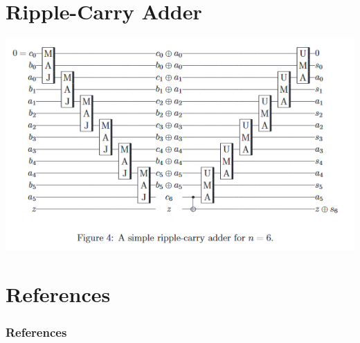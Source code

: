 \documentclass{beamer}
\begin{document}
    \section{Ripple-Carry Adder}
    \begin{frame}
      \includegraphics[width=\textwidth]{./Images/ripple-carry-adder.jpg}
    \end{frame}
  	
  	\section{}
    
    \section{References}
    \begin{frame}[allowframebreaks]
        \frametitle{References}
        
        
    \end{frame}
\end{document}
